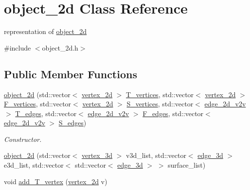 \hypertarget{classobject__2d}{}\section{object\+\_\+2d Class Reference}
\label{classobject__2d}


representation of \hyperlink{classobject__2d}{object\+\_\+2d}  




{\ttfamily \#include $<$object\+\_\+2d.\+h$>$}

\subsection*{Public Member Functions}
\begin{DoxyCompactItemize}
\item 
\hyperlink{classobject__2d_a3ed4eb36446c5dacac7cd84a3f73ba1f}{object\+\_\+2d} (std\+::vector$<$ \hyperlink{classvertex__2d}{vertex\+\_\+2d} $>$ \hyperlink{classobject__2d_aedcad81ef4cdb308ffade7bcf7de4cc2}{T\+\_\+vertices}, std\+::vector$<$ \hyperlink{classvertex__2d}{vertex\+\_\+2d} $>$ \hyperlink{classobject__2d_aa12b4ac9f646748a83b22c7a81ff1b7c}{F\+\_\+vertices}, std\+::vector$<$ \hyperlink{classvertex__2d}{vertex\+\_\+2d} $>$ \hyperlink{classobject__2d_a722b0505e408b8864809a7ae55c86df4}{S\+\_\+vertices}, std\+::vector$<$ \hyperlink{classedge__2d__v2v}{edge\+\_\+2d\+\_\+v2v} $>$ \hyperlink{classobject__2d_a1543063eb017187a7582821d1ec07faf}{T\+\_\+edges}, std\+::vector$<$ \hyperlink{classedge__2d__v2v}{edge\+\_\+2d\+\_\+v2v} $>$ \hyperlink{classobject__2d_abb23f1e7a00cef6deba5d997ff40a751}{F\+\_\+edges}, std\+::vector$<$ \hyperlink{classedge__2d__v2v}{edge\+\_\+2d\+\_\+v2v} $>$ \hyperlink{classobject__2d_ad13cc39539ebc9c5634ae59dea81e33c}{S\+\_\+edges})
\begin{DoxyCompactList}\small\item\em Constructor. \end{DoxyCompactList}\item 
\hyperlink{classobject__2d_a52104b7df912451e4dfdafeb2db8528f}{object\+\_\+2d} (std\+::vector$<$ \hyperlink{classvertex__3d}{vertex\+\_\+3d} $>$ v3d\+\_\+list, std\+::vector$<$ \hyperlink{classedge__3d}{edge\+\_\+3d} $>$ e3d\+\_\+list, std\+::vector$<$ std\+::vector$<$ \hyperlink{classedge__3d}{edge\+\_\+3d} $>$ $>$ surface\+\_\+list)
\item 
void \hyperlink{classobject__2d_a900bb547b93a4c92f3daf3acaf580333}{add\+\_\+\+T\+\_\+vertex} (\hyperlink{classvertex__2d}{vertex\+\_\+2d} v)

\end{DoxyCompactItemize}
